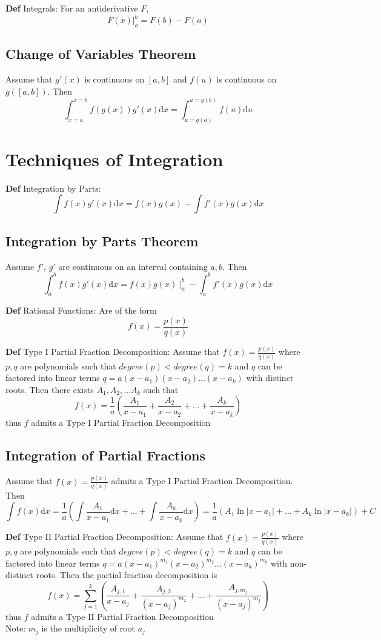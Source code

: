 \documentclass[11pt,notitlepage]{report}
\begin{document}
\textbf{Def} Integrals: For an antiderivative $F$,
$$F(x) |_a^b = F(b) - F(a)$$

\section{Change of Variables Theorem}Assume that $g'(x)$ is continuous on $[a, b]$ and $f(u)$ is continuous on $g([a, b])$. Then
$$\int_{x=a}^{x=b} f(g(x))g'(x) \mathrm{d} x = \int_{u=g(a)}^{u=g(b)} f(u) \mathrm{d} u$$


\chapter{Techniques of Integration}


\textbf{Def} Integration by Parts:
$$\int f(x)g'(x) \mathrm{d}x = f(x)g(x) - \int f'(x)g(x) \mathrm{d}x$$

\section{Integration by Parts Theorem}Assume $f'$, $g'$ are continuous on an interval containing $a, b$. Then
$$\int_a^b f(x)g'(x) \mathrm{d}x = f(x)g(x)\mid_a^b - \int_a^b f'(x)g(x) \mathrm{d}x$$

\textbf{Def} Rational Functions: Are of the form
$$f(x) = \frac{p(x)}{q(x)}$$

\textbf{Def} Type I Partial Fraction Decomposition: Assume that $f(x) = \frac{p(x)}{q(x)}$ where $p, q$ are polynomials such that $degree(p) < degree (q) = k$ and $q$ can be factored into linear terms $q = a(x-a_1)(x-a_2)\dots(x-a_k)$ with distinct roots. Then there exists $A_1, A_2, \dots A_k$ such that
$$f(x) = \frac{1}{a}\left(\frac{A_1}{x-a_1}+\frac{A_2}{x-a_2}+\dots+\frac{A_k}{x-a_k}\right)$$
thus $f$ admits a Type I Partial Fraction Decomposition

\section{Integration of Partial Fractions}Assume that $f(x) = \frac{p(x)}{q(x)}$ admits a Type I Partial Fraction Decomposition. Then
$$\int f(x)\mathrm{d}x = \frac{1}{a}\left(\int \frac{A_1}{x-a_1}\mathrm{d}x+\dots+\int \frac{A_k}{x-a_k}\mathrm{d}x\right) = \frac{1}{a}\left(A_1\ln{|x-a_1|}+\dots+A_k\ln{|x-a_k|}\right) + C$$

\textbf{Def} Type II Partial Fraction Decomposition: Assume that $f(x) = \frac{p(x)}{q(x)}$ where $p, q$ are polynomials such that $degree(p) < degree (q) = k$ and $q$ can be factored into linear terms $q = a(x-a_1)^{m_1}(x-a_2)^{m_2}\dots(x-a_k)^{m_k}$ with non-distinct roots. Then the partial fraction decomposition is
$$f(x) = \sum_{j=1}^{k} \left(\frac{A_{j,1}}{x-a_j}+\frac{A_{j,2}}{(x-a_j)^{m_2}}+\dots+\frac{A_{j,m_j}}{(x-a_j)^{m_j}}\right)$$
thus $f$ admits a Type II Partial Fraction Decomposition\\
\hspace*{5mm} Note: $m_j$ is the multiplicity of root $a_j$
\end{document}
